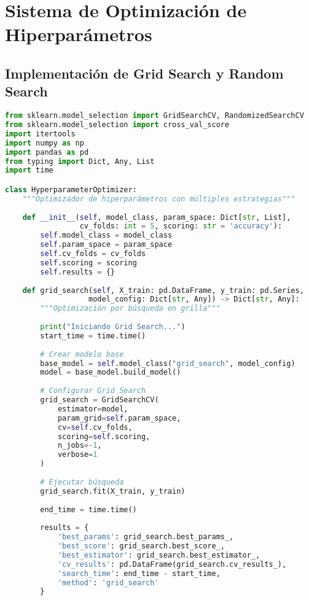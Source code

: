 \section{Sistema de Optimización de Hiperparámetros}

\subsection{Implementación de Grid Search y Random Search}

\begin{lstlisting}[language=Python, caption=Sistema de optimización de hiperparámetros]
from sklearn.model_selection import GridSearchCV, RandomizedSearchCV
from sklearn.model_selection import cross_val_score
import itertools
import numpy as np
import pandas as pd
from typing import Dict, Any, List
import time

class HyperparameterOptimizer:
    """Optimizador de hiperparámetros con múltiples estrategias"""
    
    def __init__(self, model_class, param_space: Dict[str, List], 
                 cv_folds: int = 5, scoring: str = 'accuracy'):
        self.model_class = model_class
        self.param_space = param_space
        self.cv_folds = cv_folds
        self.scoring = scoring
        self.results = {}
    
    def grid_search(self, X_train: pd.DataFrame, y_train: pd.Series, 
                   model_config: Dict[str, Any]) -> Dict[str, Any]:
        """Optimización por búsqueda en grilla"""
        
        print("Iniciando Grid Search...")
        start_time = time.time()
        
        # Crear modelo base
        base_model = self.model_class("grid_search", model_config)
        model = base_model.build_model()
        
        # Configurar Grid Search
        grid_search = GridSearchCV(
            estimator=model,
            param_grid=self.param_space,
            cv=self.cv_folds,
            scoring=self.scoring,
            n_jobs=-1,
            verbose=1
        )
        
        # Ejecutar búsqueda
        grid_search.fit(X_train, y_train)
        
        end_time = time.time()
        
        results = {
            'best_params': grid_search.best_params_,
            'best_score': grid_search.best_score_,
            'best_estimator': grid_search.best_estimator_,
            'cv_results': pd.DataFrame(grid_search.cv_results_),
            'search_time': end_time - start_time,
            'method': 'grid_search'
        }
        

\end{lstlisting}
